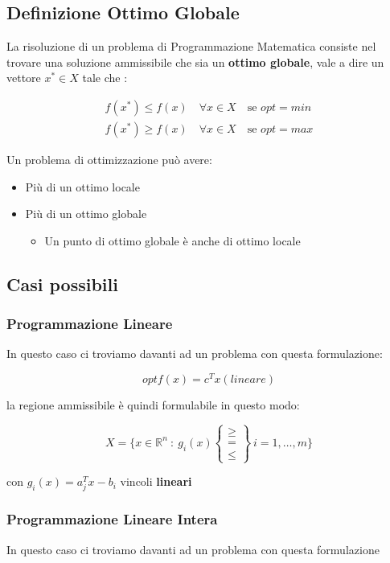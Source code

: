 \subsection{Definizione Ottimo Globale}
La risoluzione di un problema di Programmazione Matematica consiste nel trovare una soluzione ammissibile che sia un \textbf{ottimo globale}, vale a dire un vettore $x^* \in X$ tale che :

\begin{gather*}
    f(x^*) \leq f(x) \quad \forall x \in X \quad \text{se } opt = min \\
    f(x^*) \geq f(x) \quad \forall x \in X \quad \text{se } opt = max
\end{gather*}

Un problema di ottimizzazione può avere:
\begin{itemize}
    \item Più di un ottimo locale
    \item Più di un ottimo globale
    \begin{itemize}
        \item Un punto di ottimo globale è anche di ottimo locale
    \end{itemize}
\end{itemize}

\subsection{Casi possibili}

\subsubsection{Programmazione Lineare}
In questo caso ci troviamo davanti ad un problema con questa formulazione:

$$
    opt f(x) = c^T x (lineare)
$$

la regione ammissibile è quindi formulabile in questo modo:

$$
        X = \{x \in \mathbb{R}^n \ :\  g_i(x)
        \left\{
        \begin{matrix}
        \geq \\
        = \\
        \leq
        \end{matrix}
        \right\}
        \ i=1,\dots,m
        \}
$$

con $g_i(x)=a^T_j x - b_i$ vincoli \textbf{lineari}

\subsubsection{Programmazione Lineare Intera}
In questo caso ci troviamo davanti ad un problema con questa formulazione


